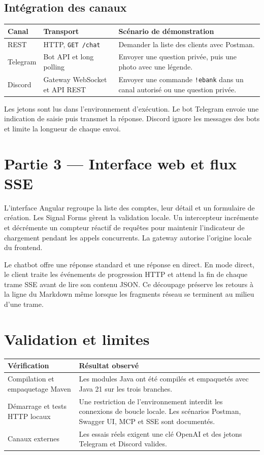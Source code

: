 \documentclass[11pt,a4paper]{article}
\newcommand{\code}[1]{\texttt{#1}}
\begin{document}
\subsection{Intégration des canaux}
\begin{center}
\begin{tabularx}{\linewidth}{@{}lYY@{}}
\toprule
\textbf{Canal} & \textbf{Transport} & \textbf{Scénario de démonstration}\\
\midrule
REST & HTTP, \code{GET /chat} & Demander la liste des clients avec Postman.\\
Telegram & Bot API et long polling & Envoyer une question privée, puis une photo avec une légende.\\
Discord & Gateway WebSocket et API REST & Envoyer une commande \code{!ebank} dans un canal autorisé ou une question privée.\\
\bottomrule
\end{tabularx}
\end{center}

Les jetons sont lus dans l'environnement d'exécution. Le bot Telegram envoie une indication de saisie puis transmet la réponse. Discord ignore les messages des bots et limite la longueur de chaque envoi.

\section{Partie 3 — Interface web et flux SSE}
L'interface Angular regroupe la liste des comptes, leur détail et un formulaire de création. Les Signal Forms gèrent la validation locale. Un intercepteur incrémente et décrémente un compteur réactif de requêtes pour maintenir l'indicateur de chargement pendant les appels concurrents. La gateway autorise l'origine locale du frontend.

Le chatbot offre une réponse standard et une réponse en direct. En mode direct, le client traite les événements de progression HTTP et attend la fin de chaque trame SSE avant de lire son contenu JSON. Ce découpage préserve les retours à la ligne du Markdown même lorsque les fragments réseau se terminent au milieu d'une trame.

\clearpage
\section{Validation et limites}
\begin{center}
\begin{tabularx}{\linewidth}{@{}YY@{}}
\toprule
\textbf{Vérification} & \textbf{Résultat observé}\\
\midrule
Compilation et empaquetage Maven & Les modules Java ont été compilés et empaquetés avec Java 21 sur les trois branches.\\
Démarrage et tests HTTP locaux & Une restriction de l'environnement interdit les connexions de boucle locale. Les scénarios Postman, Swagger UI, MCP et SSE sont documentés.\\
Canaux externes & Les essais réels exigent une clé OpenAI et des jetons Telegram et Discord valides.\\
\bottomrule
\end{tabularx}
\end{center}
\end{document}
